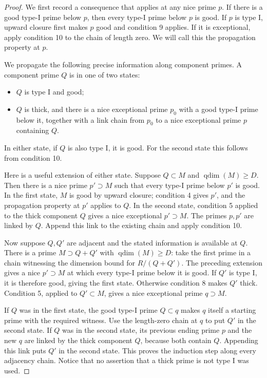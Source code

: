 \begin{proof}
We first record a consequence that applies at any nice prime
\(p\).  If there is a good type-I prime below \(p\), then
every type-I prime below \(p\) is good.  If \(p\) is type I,
upward closure first makes \(p\) good and condition 9 applies.
If it is exceptional, apply condition 10 to the chain of
length zero.  We will call this the propagation property at
\(p\).

We propagate the following precise information along component
primes.  A component prime \(Q\) is in one of two states:
\begin{itemize}
\item \(Q\) is type I and good;
\item \(Q\) is thick, and there is a nice exceptional prime
      \(p_0\) with a good type-I prime below it, together with
      a link chain from \(p_0\) to a nice exceptional prime
      \(p\) containing \(Q\).
\end{itemize}
In either state, if \(Q\) is also type I, it is good.
For the second state this follows from condition 10.

Here is a useful extension of either state.  Suppose
\(Q\subset M\) and \(\operatorname{qdim}(M)\ge D\).
Then there is a nice prime \(p'\supset M\) such that every
type-I prime below \(p'\) is good.  In the first state,
\(M\) is good by upward closure; condition 4 gives \(p'\),
and the propagation property at \(p'\) applies to \(Q\).
In the second state, condition 5 applied to the thick
component \(Q\) gives a nice exceptional \(p'\supset M\).
The primes \(p,p'\) are linked by \(Q\).  Append this link
to the existing chain and apply condition 10.

Now suppose \(Q,Q'\) are adjacent and the stated information
is available at \(Q\).  There is a prime \(M\supset Q+Q'\)
with \(\operatorname{qdim}(M)\ge D\): take the first prime
in a chain witnessing the dimension bound for \(R/(Q+Q')\).
The preceding extension gives a nice \(p'\supset M\) at
which every type-I prime below it is good.
If \(Q'\) is type I, it is therefore good, giving the first
state.  Otherwise condition 8 makes \(Q'\) thick.
Condition 5, applied to \(Q'\subset M\), gives a nice
exceptional prime \(q\supset M\).

If \(Q\) was in the first state, the good type-I prime
\(Q\subset q\) makes \(q\) itself a starting prime with
the required witness.  Use the length-zero chain at \(q\)
to put \(Q'\) in the second state.
If \(Q\) was in the second state, its previous ending prime
\(p\) and the new \(q\) are linked by the thick component
\(Q\), because both contain \(Q\).  Appending this link
puts \(Q'\) in the second state.  This proves the induction
step along every adjacency chain.  Notice that no assertion
that a thick prime is not type I was used.


\end{proof}
